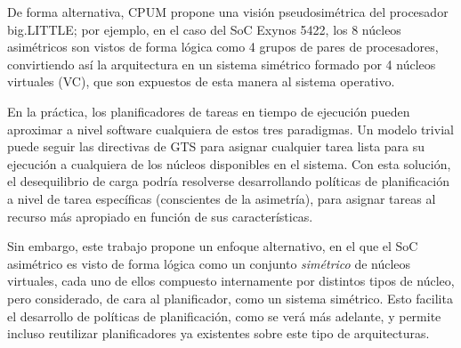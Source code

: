 De forma alternativa, CPUM propone una visión pseudosimétrica del procesador big.LITTLE; por ejemplo,
en el caso del SoC Exynos 5422, los 8 núcleos asimétricos son vistos de forma lógica como 4 grupos
de pares de procesadores, convirtiendo así la arquitectura en un sistema simétrico formado por
4 núcleos virtuales (VC), que son expuestos de esta manera al sistema operativo.

En la práctica, los planificadores de tareas en tiempo de ejecución pueden aproximar a nivel software
cualquiera de estos tres paradigmas. Un modelo trivial puede seguir las directivas de GTS para asignar
cualquier tarea lista para su ejecución a cualquiera de los núcleos disponibles en el sistema. Con esta
solución, el desequilibrio de carga podría resolverse desarrollando políticas de planificación a nivel
de tarea específicas (conscientes de la asimetría), para asignar tareas al recurso más apropiado en 
función de sus características. 

Sin embargo, este trabajo propone un enfoque alternativo, en el que el SoC asimétrico es visto de forma
lógica como un conjunto {\em simétrico} de núcleos virtuales, cada uno de ellos compuesto internamente
por distintos tipos de núcleo, pero considerado, de cara al planificador, como un sistema simétrico. Esto
facilita el desarrollo de políticas de planificación, como se verá más adelante, y permite incluso
reutilizar planificadores ya existentes sobre este tipo de arquitecturas.



